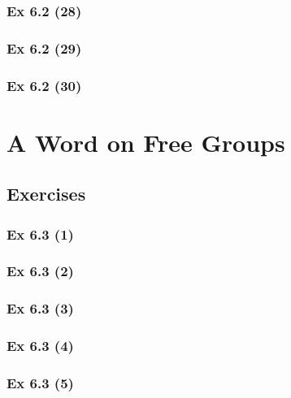 \subsubsection{Ex 6.2 (28)}\label{sec:Ex_6.2.28}

\subsubsection{Ex 6.2 (29)}\label{sec:Ex_6.2.29}

\subsubsection{Ex 6.2 (30)}\label{sec:Ex_6.2.30}

\newpage		%

\section{A Word on Free Groups}\label{sec:6.3}	
\subsection*{Exercises}\label{sec:6.3_Exercises}

\subsubsection{Ex 6.3 (1)}\label{sec:Ex_6.3.1}

\subsubsection{Ex 6.3 (2)}\label{sec:Ex_6.3.2}

\subsubsection{Ex 6.3 (3)}\label{sec:Ex_6.3.3}

\subsubsection{Ex 6.3 (4)}\label{sec:Ex_6.3.4}

\subsubsection{Ex 6.3 (5)}\label{sec:Ex_6.3.5}

